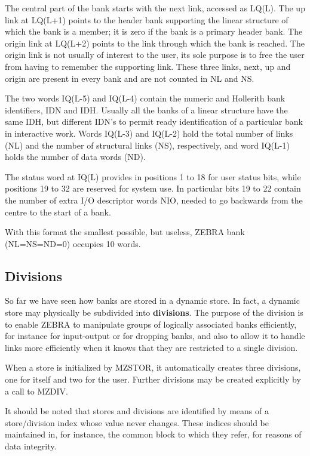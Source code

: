 \par The central part of the bank starts with the next link,
accessed as LQ(L).
The up link at LQ(L+1) points to the header bank supporting
the linear structure of which the bank is a member;
it is zero if the bank is a primary header bank.
The origin link at LQ(L+2) points to the link
through which the bank is reached.
The origin link is not usually of interest to the user,
its sole purpose is to free the user from having to remember the
supporting link. These three links, next, up and origin are present
in every bank and are not counted in NL and NS.
\par
The two words IQ(L-5) and IQ(L-4) contain the numeric and Hollerith bank
identifiers, IDN and IDH. Usually all the banks of a linear structure
have the same IDH, but different IDN's to permit ready
identification of a particular bank in interactive work.
Words IQ(L-3) and IQ(L-2)
hold the total number of links (NL) and the number of structural
links (NS), respectively,
and word IQ(L-1) holds the number of data words (ND).
\par
The status word at IQ(L) provides in positions
1 to 18 for user status bits,
while positions 19 to 32 are reserved for system use. In particular
bits 19 to 22 contain the number of extra I/O descriptor words NIO,
needed to go backwards from the centre to the start of a bank.
\par
With this format the smallest possible, but useless, ZEBRA
bank (NL=NS=ND=0) occupies 10 words.
\par
\subsection{Divisions}
\par
So far we have seen how banks are stored in a dynamic
store. In fact, a dynamic store may physically be subdivided into
{\bf divisions}. The purpose of the division is to enable ZEBRA to
manipulate groups of logically associated banks efficiently, for instance
for input-output or for dropping banks, and also to allow it to handle links
more efficiently when it knows that they are restricted to a single
division.
\par
When a store is initialized by MZSTOR, it automatically creates three
divisions, one for itself and two for the user. Further divisions may be
created explicitly by a call to MZDIV.
\par
It should be noted that stores and divisions are identified by
means of a store/division index whose value never changes. These indices
should be maintained in, for instance, the common block to which they
refer, for reasons of
data integrity.
